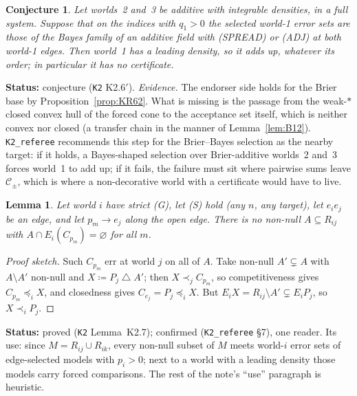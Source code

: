 \documentclass[11pt]{article}
\newtheorem{lemma}[theorem]{Lemma}
\newtheorem{conjecture}[theorem]{Conjecture}
\theoremstyle{definition}
\theoremstyle{remark}
\newcommand{\sd}{\mathbin{\triangle}}
\newcommand{\src}[1]{\texttt{#1}}
\newcommand{\status}[1]{\par\smallskip\noindent\textbf{Status:} #1\par\smallskip}
\begin{document}
\begin{conjecture}\label{conj:K26p}
Let worlds~2 and~3 be additive with integrable densities, in a full system. Suppose that on the indices with $q_1>0$ the selected world-1 error sets are those of the Bayes family of an additive field with (SPREAD) or (ADJ) at both world-1 edges. Then world~1 has a leading density, so it adds up, whatever its order; in particular it has no certificate.
\end{conjecture}
\status{conjecture (\src{K2} K2.6$'$). \emph{Evidence.} The endorser side holds for the Brier base by Proposition~\ref{prop:KR62}. What is missing is the passage from the weak-$*$ closed convex hull of the forced cone to the acceptance set itself, which is neither convex nor closed (a transfer chain in the manner of Lemma~\ref{lem:B12}). \src{K2\_referee} recommends this step for the Brier--Bayes selection as the nearby target: if it holds, a Bayes-shaped selection over Brier-additive worlds~2 and~3 forces world~1 to add up; if it fails, the failure must sit where pairwise sums leave $\mathcal C_\pm$, which is where a non-decorative world with a certificate would have to live.}

\begin{lemma}\label{lem:K27}
Let world $i$ have strict (G), let (S) hold (any $n$, any target), let $e_ie_j$ be an edge, and let $p_m\to e_j$ along the open edge. There is no non-null $A\subseteq R_{ij}$ with $A\cap E_i(C_{p_m})=\varnothing$ for all $m$.
\end{lemma}
\begin{proof}[Proof sketch]
Such $C_{p_m}$ err at world $j$ on all of $A$. Take non-null $A'\subsetneq A$ with $A\setminus A'$ non-null and $X\coloneqq P_j\sd A'$; then $X\prec_jC_{p_m}$, so competitiveness gives $C_{p_m}\preceq_iX$, and closedness gives $C_{e_j}=P_j\preceq_iX$. But $E_iX=R_{ij}\setminus A'\subsetneq E_iP_j$, so $X\prec_iP_j$.
\end{proof}
\status{proved (\src{K2} Lemma~K2.7); confirmed (\src{K2\_referee} \S7), one reader. Its use: since $M=R_{ij}\cup R_{ik}$, every non-null subset of $M$ meets world-$i$ error sets of edge-selected models with $p_i>0$; next to a world with a leading density those models carry forced comparisons. The rest of the note's ``use'' paragraph is heuristic.}
\end{document}
